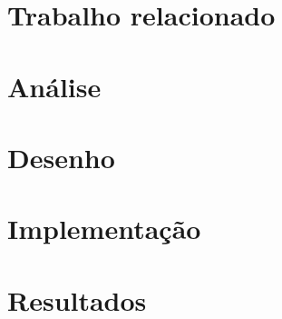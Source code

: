 \chapter{Trabalho relacionado}
\LIMPA

\chapter{Análise}
\LIMPA

\chapter{Desenho}
\LIMPA

\chapter{Implementação}
\LIMPA

\chapter{Resultados}
\LIMPA
